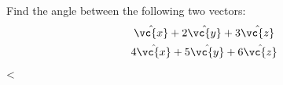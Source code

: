 Find the angle between the following two vectors:
        \begin{gather*}
          \hat{\vc{x}}+2\hat{\vc{y}}+3\hat{\vc{z}} \\
          4\hat{\vc{x}}+5\hat{\vc{y}}+6\hat{\vc{z}} 
        \end{gather*}
        <%
